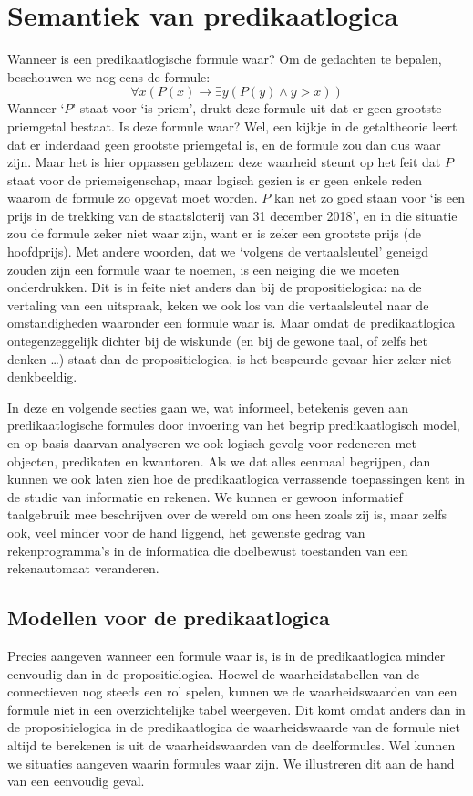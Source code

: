 \chapter{Semantiek van predikaatlogica}\label{sec:pred:semantiek}
Wanneer is een predikaatlogische formule waar? Om de gedachten te bepalen, beschouwen we nog eens de formule:
$$\forall x(P(x)\rightarrow \exists y(P(y)\wedge y>x))$$
Wanneer `$P$' staat voor `is priem', drukt deze formule uit dat er geen grootste priemgetal bestaat. Is deze formule waar? Wel, een kijkje in de getaltheorie leert dat er inderdaad geen grootste priemgetal is, en de formule zou dan dus waar zijn. Maar het is hier oppassen geblazen: deze waarheid steunt op het feit dat $P$ staat voor de priemeigenschap, maar logisch gezien is er geen enkele reden waarom de formule zo opgevat moet worden. $P$ kan net zo goed staan voor `is een prijs in de trekking van de staatsloterij van 31 december 2018', en in die situatie zou de formule zeker niet waar zijn, want er is zeker een grootste prijs (de hoofdprijs). Met andere woorden, dat we `volgens de vertaalsleutel' geneigd zouden zijn een formule waar te noemen, is een neiging die we moeten onderdrukken.  Dit is in feite niet anders dan bij de propositielogica: na de vertaling van een uitspraak, keken we ook los van die vertaalsleutel naar de omstandigheden waaronder een formule waar is. Maar omdat de predikaatlogica ontegenzeggelijk dichter bij de wiskunde (en bij de gewone taal, of zelfs het denken \ldots) staat dan de propositielogica, is het bespeurde gevaar hier zeker niet denkbeeldig.

In deze en volgende secties gaan we, wat informeel, betekenis geven aan predikaatlogische formules door invoering van het begrip predikaatlogisch model, en op basis daarvan analyseren we ook logisch gevolg voor redeneren met objecten, predikaten en kwantoren. Als we dat alles eenmaal begrijpen, dan kunnen we ook laten zien hoe de predikaatlogica verrassende toepassingen kent in de studie van informatie en rekenen. We kunnen er gewoon informatief taalgebruik mee beschrijven over de wereld om ons heen zoals zij is, maar zelfs ook, veel minder voor de hand liggend, het gewenste gedrag van rekenprogramma's in de informatica die doelbewust toestanden van een rekenautomaat veranderen.

\section{Modellen voor de predikaatlogica}
Precies aangeven wanneer een formule waar is, is in de predikaatlogica minder eenvoudig dan in de propositielogica. Hoewel de waarheidstabellen van de connectieven nog steeds een rol spelen, kunnen we de waarheidswaarden van een formule niet in een overzichtelijke tabel weergeven. Dit komt omdat anders dan in de propositielogica in de predikaatlogica de waarheidswaarde van de formule niet altijd te berekenen is uit de waarheidswaarden van de deelformules. Wel kunnen we situaties aangeven waarin formules waar zijn. We illustreren dit aan de hand van een eenvoudig geval.

